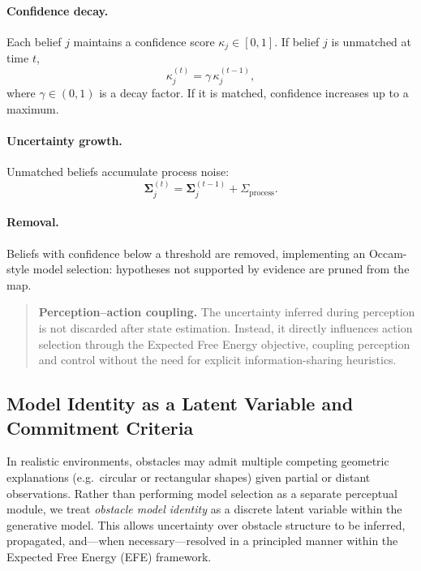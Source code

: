 \documentclass[a4paper, twoside]{article}
\begin{document}
\paragraph{Confidence decay.}
Each belief $j$ maintains a confidence score $\kappa_j\in[0,1]$. If belief $j$ is unmatched at time $t$,
\begin{equation}
\kappa_j^{(t)}=\gamma\,\kappa_j^{(t-1)},
\end{equation}
where $\gamma\in(0,1)$ is a decay factor. If it is matched, confidence increases up to a maximum.

\paragraph{Uncertainty growth.}
Unmatched beliefs accumulate process noise:
\begin{equation}
\boldsymbol{\Sigma}_j^{(t)}=\boldsymbol{\Sigma}_j^{(t-1)}+\Sigma_{\text{process}}.
\end{equation}

\paragraph{Removal.}
Beliefs with confidence below a threshold are removed, implementing an Occam-style model selection:
hypotheses not supported by evidence are pruned from the map.


\begin{quote}
\textbf{Perception–action coupling.}
The uncertainty inferred during perception is not discarded after state
estimation. Instead, it directly influences action selection through the
Expected Free Energy objective, coupling perception and control without the
need for explicit information-sharing heuristics.
\end{quote}

\subsection{Model Identity as a Latent Variable and Commitment Criteria}
\label{sec:model_selection_efe}

In realistic environments, obstacles may admit multiple competing geometric explanations
(e.g.\ circular or rectangular shapes) given partial or distant observations.
Rather than performing model selection as a separate perceptual module, we treat
\emph{obstacle model identity} as a discrete latent variable within the generative model.
This allows uncertainty over obstacle structure to be inferred, propagated, and—when
necessary—resolved in a principled manner within the Expected Free Energy (EFE) framework.
\end{document}
